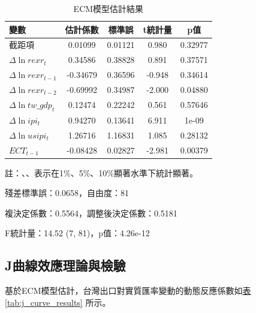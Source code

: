 \documentclass[a4paper,12pt]{article}
\begin{document}
\begin{table}[h!]
  \centering
  \begin{threeparttable}
    \caption{ECM模型估計結果}
    \label{tab:ecm_results}
    \begin{tabular}{lcccc}
      \toprule
      變數 & 估計係數 & 標準誤 & t統計量 & p值 \\
      \midrule
      截距項               & 0.01099         & 0.01121 & 0.980   & 0.32977 \\
      $\Delta \ln rexr_t$    & 0.34586         & 0.38828 & 0.891   & 0.37571 \\
      $\Delta \ln rexr_{t-1}$  & -0.34679        & 0.36596 & -0.948  & 0.34614 \\
      $\Delta \ln rexr_{t-2}$  & -0.69992\tnote{**}  & 0.34987 & -2.000  & 0.04880 \\
      $\Delta \ln tw\_gdp_t$ & 0.12474         & 0.22242 & 0.561   & 0.57646 \\
      $\Delta \ln ipi_t$     & 0.94270\tnote{***}  & 0.13641 & 6.911   & 1e-09 \\
      $\Delta \ln usipi_t$   & 1.26716         & 1.16831 & 1.085   & 0.28132 \\
      $ECT_{t-1}$            & -0.08428\tnote{***} & 0.02827 & -2.981  & 0.00379 \\
      \bottomrule
    \end{tabular}

    \begin{tablenotes}
      \footnotesize %
      \item 註：\tnote{***}、\tnote{**}、\tnote{*}表示在1\%、5\%、10\%顯著水準下統計顯著。
      \item 殘差標準誤：0.0658，自由度：81
      \item 複決定係數：0.5564，調整後決定係數：0.5181
      \item F統計量：14.52 (7, 81)，p值：4.26e-12
    \end{tablenotes}
  \end{threeparttable}
\end{table}

\subsection{J曲線效應理論與檢驗}
基於ECM模型估計，台灣出口對實質匯率變動的動態反應係數如\hspace{1pt}\hyperref[tab:j_curve_results]{表 \ref{tab:j_curve_results}} 所示。
\end{document}
